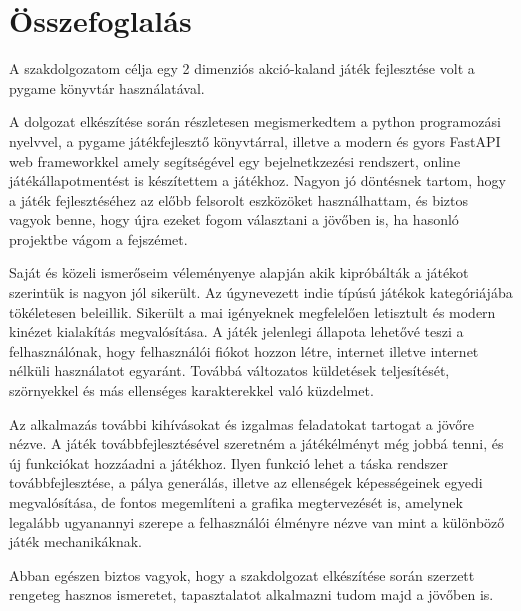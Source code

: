 \chapter{Összefoglalás}

\indent \indent A szakdolgozatom célja egy 2 dimenziós akció-kaland játék fejlesztése volt a pygame könyvtár használatával.

A dolgozat elkészítése során részletesen megismerkedtem a python programozási nyelvvel, a pygame játékfejlesztő könyvtárral, illetve a modern és gyors FastAPI web frameworkkel amely segítségével egy bejelnetkzezési rendszert, online játékállapotmentést is készítettem a játékhoz. Nagyon jó döntésnek tartom, hogy a játék fejlesztéséhez az előbb felsorolt eszközöket használhattam, és biztos vagyok benne, hogy újra ezeket fogom választani a jövőben is, ha hasonló projektbe vágom a fejszémet.

Saját és közeli ismerőseim véleményenye alapján akik kipróbálták a játékot szerintük is nagyon jól sikerült. Az úgynevezett indie típúsú játékok kategóriájába tökéletesen beleillik. Sikerült a mai igényeknek megfelelően letisztult és modern kinézet kialakítás megvalósítása. A játék jelenlegi állapota lehetővé teszi a felhasználónak, hogy felhasználói fiókot hozzon létre, internet illetve internet nélküli használatot egyaránt. Továbbá változatos küldetések teljesítését, szörnyekkel és más ellenséges karakterekkel való küzdelmet.

Az alkalmazás további kihívásokat és izgalmas feladatokat tartogat a jövőre nézve. A játék továbbfejlesztésével szeretném a játékélményt még jobbá tenni, és új funkciókat hozzáadni a játékhoz. Ilyen funkció lehet a táska rendszer továbbfejlesztése, a pálya generálás, illetve az ellenségek képességeinek egyedi megvalósítása, de fontos megemlíteni a grafika megtervezését is, amelynek legalább ugyanannyi szerepe a felhasználói élményre nézve van mint a különböző játék mechanikáknak.  

Abban egészen biztos vagyok, hogy a szakdolgozat elkészítése során szerzett rengeteg hasznos ismeretet, tapasztalatot alkalmazni tudom majd a jövőben is.
